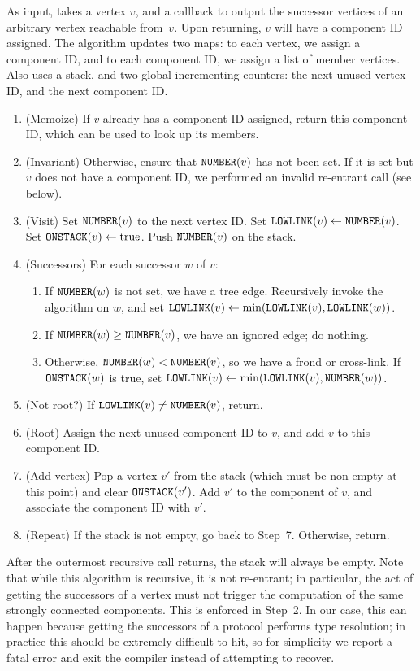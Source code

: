 \documentclass[../generics]{subfiles}
\begin{document}
\begin{algorithm}\label{tarjan}
As input, takes a vertex $v$, and a callback to output the successor vertices of an arbitrary vertex reachable from~$v$. Upon returning, $v$ will have a component ID assigned. The algorithm updates two maps: to each vertex, we assign a component ID, and to each component ID, we assign a list of member vertices. Also uses a stack, and two global incrementing counters: the next unused vertex ID, and the next component ID.
\begin{enumerate}
\item (Memoize) If $v$ already has a component ID assigned, return this component ID, which can be used to look up its members.
\item (Invariant) Otherwise, ensure that $\texttt{NUMBER}(v)$ has not been set. If it is set but $v$ does not have a component ID, we performed an invalid re-entrant call (see below).
\item (Visit) Set $\texttt{NUMBER}(v)$ to the next vertex ID. Set $\texttt{LOWLINK}(v)\leftarrow\texttt{NUMBER}(v)$. Set $\texttt{ONSTACK}(v)\leftarrow \textrm{true}$. Push $\texttt{NUMBER}(v)$ on the stack.
\item (Successors) For each successor $w$ of $v$:
\begin{enumerate}
\item If $\texttt{NUMBER}(w)$ is not set, we have a tree edge. Recursively invoke the algorithm on $w$, and set $\texttt{LOWLINK}(v)\leftarrow\min(\texttt{LOWLINK}(v), \texttt{LOWLINK}(w))$.
\item If $\texttt{NUMBER}(w)\geq\texttt{NUMBER}(v)$, we have an ignored edge; do nothing.
\item Otherwise, $\texttt{NUMBER}(w)<\texttt{NUMBER}(v)$, so we have a frond or cross-link. If $\texttt{ONSTACK}(w)$ is true, set $\texttt{LOWLINK}(v)\leftarrow\min(\texttt{LOWLINK}(v),\texttt{NUMBER}(w))$.
\end{enumerate}
\item (Not root?) If $\texttt{LOWLINK}(v)\neq\texttt{NUMBER}(v)$, return.
\item (Root) Assign the next unused component ID to $v$, and add $v$ to this component ID.
\item (Add vertex) Pop a vertex $v'$ from the stack (which must be non-empty at this point) and clear $\texttt{ONSTACK}(v')$. Add $v'$ to the component of $v$, and associate the component ID with $v'$.
\item (Repeat) If the stack is not empty, go back to Step~7. Otherwise, return.
\end{enumerate}
\end{algorithm}
After the outermost recursive call returns, the stack will always be empty. Note that while this algorithm is recursive, it is not re-entrant; in particular, the act of getting the successors of a vertex must not trigger the computation of the same strongly connected components. This is enforced in Step~2. In our case, this can happen because getting the successors of a protocol performs type resolution; in practice this should be extremely difficult to hit, so for simplicity we report a fatal error and exit the compiler instead of attempting to recover.
\end{document}
